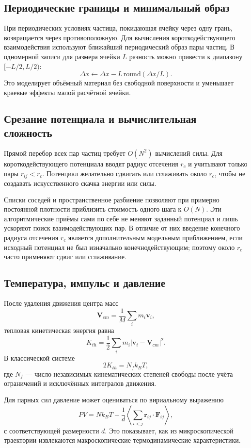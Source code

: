 \subsection{Периодические границы и минимальный образ}

При периодических условиях частица, покидающая ячейку через одну грань,
возвращается через противоположную. Для вычисления короткодействующего
взаимодействия используют ближайший периодический образ пары частиц. В
одномерной записи для размера ячейки $L$ разность можно привести к диапазону
$[-L/2,L/2)$:
\[
\Delta x\leftarrow\Delta x-L\,\mathrm{round}(\Delta x/L).
\]
Это моделирует объёмный материал без свободной поверхности и уменьшает краевые
эффекты малой расчётной ячейки.

\subsection{Срезание потенциала и вычислительная сложность}

Прямой перебор всех пар частиц требует $O(N^2)$ вычислений силы. Для
короткодействующего потенциала вводят радиус отсечения $r_c$ и учитывают только
пары $r_{ij}<r_c$. Потенциал желательно сдвигать или сглаживать около $r_c$, чтобы
не создавать искусственного скачка энергии или силы.

Списки соседей и пространственное разбиение позволяют при примерно постоянной
плотности приблизить стоимость одного шага к $O(N)$. Эти алгоритмические приёмы
сами по себе не меняют заданный потенциал и лишь ускоряют поиск взаимодействующих
пар. В отличие от них введение конечного радиуса отсечения $r_c$ является
дополнительным модельным приближением, если исходный потенциал не был изначально
конечнодействующим; поэтому около $r_c$ часто применяют сдвиг или сглаживание.

\subsection{Температура, импульс и давление}

После удаления движения центра масс
\[
\mathbf V_{cm}=\frac{1}{M}\sum_i m_i\mathbf v_i,
\]
тепловая кинетическая энергия равна
\[
K_{th}=\frac12\sum_i m_i|\mathbf v_i-\mathbf V_{cm}|^2.
\]
В классической системе
\[
2K_{th}=N_f k_BT,
\]
где $N_f$ --- число независимых кинематических степеней свободы после учёта
ограничений и исключённых интегралов движения.

Для парных сил давление может оцениваться по вириальному выражению
\[
PV=Nk_BT+\frac{1}{d}
\left\langle\sum_{i<j}\mathbf r_{ij}\cdot\mathbf F_{ij}\right\rangle,
\]
с соответствующей размерности $d$. Это показывает, как из микроскопической
траектории извлекаются макроскопические термодинамические характеристики.


